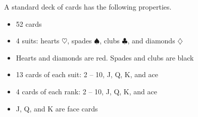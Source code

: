 \documentclass[10pt]{article}
\begin{document}
A standard deck of cards has the following properties.
\begin{itemize}
\item 52 cards
\item 4 suits:  hearts $\heartsuit$, spades $\spadesuit$, clubs $\clubsuit$,
  and diamonds $\diamondsuit$
\item Hearts and diamonds are red.  Spades and clubs are black
\item 13 cards of each suit:  2 -- 10, J, Q, K, and ace
\item 4 cards of each rank:  2 -- 10, J, Q, K, and ace
\item J, Q, and K are face cards
\end{itemize}
\bigskip
\bigskip

\eject
\end{document}
